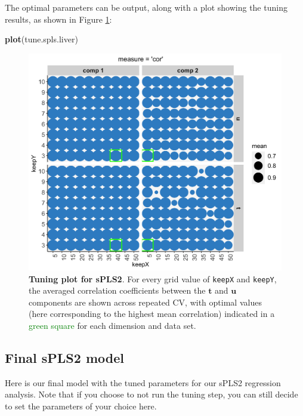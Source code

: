 \documentclass[]{book}
\newenvironment{Shaded}{\begin{snugshade}}{\end{snugshade}}
\newcommand{\KeywordTok}[1]{\textcolor[rgb]{0.13,0.29,0.53}{\textbf{#1}}}
\newcommand{\NormalTok}[1]{#1}
\begin{document}
The optimal parameters can be output, along with a plot showing the
tuning results, as shown in Figure \ref{fig:spls2-tune}:

\begin{Shaded}
\begin{Highlighting}[]
\KeywordTok{plot}\NormalTok{(tune.spls.liver)}
\end{Highlighting}
\end{Shaded}

\begin{figure}

{\centering \includegraphics[width=0.6\linewidth]{Figures/PLS/spls2-tune-1} 

}

\caption{\textbf{Tuning plot for sPLS2}. For every grid value of
\texttt{keepX} and \texttt{keepY}, the averaged correlation coefficients
between the \(\boldsymbol t\) and \(\boldsymbol u\) components are shown
across repeated CV, with optimal values (here corresponding to the
highest mean correlation) indicated in a \textcolor{green}{green square}
for each dimension and data set.}\label{fig:spls2-tune}
\end{figure}








\subsection{Final sPLS2 model}\label{final-spls2}

Here is our final model with the tuned parameters for our sPLS2
regression analysis. Note that if you choose to not run the tuning step,
you can still decide to set the parameters of your choice here.
\end{document}

